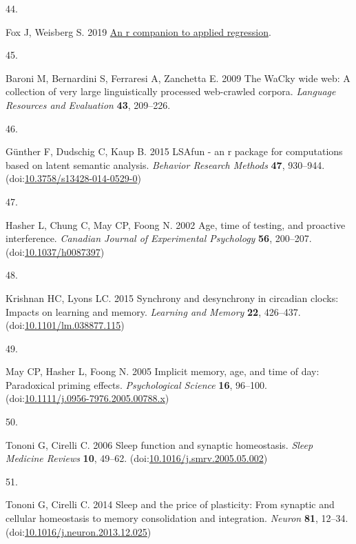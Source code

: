 \documentclass[
]{article}
\newlength{\cslhangindent}
\newlength{\csllabelwidth}
\newlength{\cslentryspacingunit} %
\newenvironment{CSLReferences}[2] %
 {%
  \setlength{\parindent}{0pt}
  \ifodd #1
  \let\oldpar\par
  \def\par{\hangindent=\cslhangindent\oldpar}
  \fi
  \setlength{\parskip}{#2\cslentryspacingunit}
 }%
 {}
\newcommand{\CSLLeftMargin}[1]{\parbox[t]{\csllabelwidth}{#1}}
\newcommand{\CSLRightInline}[1]{\parbox[t]{\linewidth - \csllabelwidth}{#1}\break}
\begin{document}
\begin{CSLReferences}{0}{0}
\leavevmode{}%
\CSLLeftMargin{44. }%
\CSLRightInline{Fox J, Weisberg S. 2019 \href{https://socialsciences.mcmaster.ca/jfox/Books/Companion/index.html}{An r companion to applied regression}. }

\leavevmode{}%
\CSLLeftMargin{45. }%
\CSLRightInline{Baroni M, Bernardini S, Ferraresi A, Zanchetta E. 2009 The WaCky wide web: A collection of very large linguistically processed web-crawled corpora. \emph{Language Resources and Evaluation} \textbf{43}, 209--226.}

\leavevmode{}%
\CSLLeftMargin{46. }%
\CSLRightInline{Günther F, Dudschig C, Kaup B. 2015 LSAfun - an r package for computations based on latent semantic analysis. \emph{Behavior Research Methods} \textbf{47}, 930--944. (doi:\href{https://doi.org/10.3758/s13428-014-0529-0}{10.3758/s13428-014-0529-0})}

\leavevmode{}%
\CSLLeftMargin{47. }%
\CSLRightInline{Hasher L, Chung C, May CP, Foong N. 2002 Age, time of testing, and proactive interference. \emph{Canadian Journal of Experimental Psychology} \textbf{56}, 200--207. (doi:\href{https://doi.org/10.1037/h0087397}{10.1037/h0087397})}

\leavevmode{}%
\CSLLeftMargin{48. }%
\CSLRightInline{Krishnan HC, Lyons LC. 2015 Synchrony and desynchrony in circadian clocks: Impacts on learning and memory. \emph{Learning and Memory} \textbf{22}, 426--437. (doi:\href{https://doi.org/10.1101/lm.038877.115}{10.1101/lm.038877.115})}

\leavevmode{}%
\CSLLeftMargin{49. }%
\CSLRightInline{May CP, Hasher L, Foong N. 2005 Implicit memory, age, and time of day: Paradoxical priming effects. \emph{Psychological Science} \textbf{16}, 96--100. (doi:\href{https://doi.org/10.1111/j.0956-7976.2005.00788.x}{10.1111/j.0956-7976.2005.00788.x})}

\leavevmode{}%
\CSLLeftMargin{50. }%
\CSLRightInline{Tononi G, Cirelli C. 2006 Sleep function and synaptic homeostasis. \emph{Sleep Medicine Reviews} \textbf{10}, 49--62. (doi:\href{https://doi.org/10.1016/j.smrv.2005.05.002}{10.1016/j.smrv.2005.05.002})}

\leavevmode{}%
\CSLLeftMargin{51. }%
\CSLRightInline{Tononi G, Cirelli C. 2014 Sleep and the price of plasticity: From synaptic and cellular homeostasis to memory consolidation and integration. \emph{Neuron} \textbf{81}, 12--34. (doi:\href{https://doi.org/10.1016/j.neuron.2013.12.025}{10.1016/j.neuron.2013.12.025})}


\end{CSLReferences}
\end{document}
